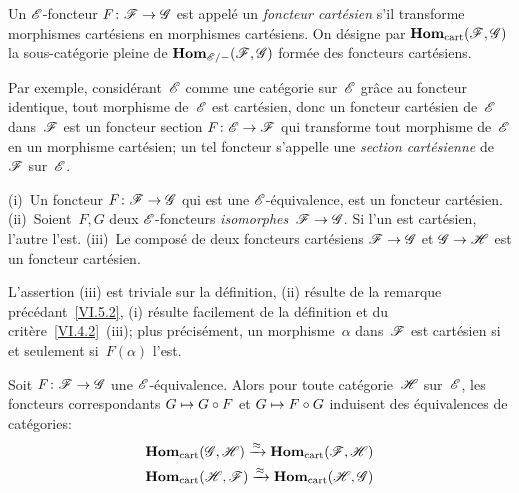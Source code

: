 \begin{definition}
\label{VI.5.2} Un $\cal{E}$-foncteur $F\colon \cal{F}\to\cal{G}$ est
appel\'e un \emph{foncteur cartésien}
s'il transforme morphismes cart\'esiens en morphismes
cart\'esiens. On d\'esigne par $\SheafHom_\cart(\cal{F},\cal{G})$
\label{indnot:fq}la sous-cat\'egorie pleine de
$\SheafHom_{\cal{E}/-}(\cal{F},\cal{G})$ form\'ee des foncteurs
cart\'esiens.

Par exemple, consid\'erant~$\cal{E}$ comme une cat\'egorie
sur~$\cal{E}$ gr\^ace au foncteur identique, tout morphisme
de~$\cal{E}$ est cart\'esien, donc un foncteur cart\'esien
de~$\cal{E}$ dans~$\cal{F}$ est un foncteur section $F\colon
\cal{E}\to\cal{F}$ qui transforme tout morphisme de~$\cal{E}$ en un
morphisme cart\'esien; un tel foncteur s'appelle une \emph{section
cartésienne} de~$\cal{F}$ sur~$\cal{E}$.
\end{definition}

\begin{proposition}
\label{VI.5.3} \textup{(i)}~Un foncteur $F\colon \cal{F} \to \cal{G}$ qui est une
$\cal{E}$-\'equivalence, est un foncteur cart\'esien.
\textup{(ii)}~Soient~$F,G$ deux $\cal{E}$-foncteurs
\emph{isomorphes}~$\cal{F}\to\cal{G}$. Si l'un est cart\'esien,
l'autre l'est. \textup{(iii)}~Le compos\'e de deux foncteurs cart\'esiens
$\cal{F}\to\cal{G}$ et $\cal{G}\to\cal{H}$ est un foncteur
cart\'esien.
\end{proposition}

L'assertion (iii) est triviale sur la d\'efinition, (ii)
r\'esulte de la remarque pr\'ec\'edant~\ref{VI.5.2}, (i) r\'esulte
facilement de la d\'efinition et du crit\`ere~\ref{VI.4.2}~(iii); plus
pr\'ecis\'ement, un morphisme~$\alpha$ dans~$\cal{F}$ est
cart\'esien si et seulement si~$F(\alpha)$ l'est.

\begin{corollaire}
\label{VI.5.4}
Soit $F \colon \cal{F} \to \cal{G}$ une
$\cal{E}$-\'equivalence. Alors pour toute cat\'egorie~$\cal{H}$
sur~$\cal{E}$, les foncteurs correspondants $G \mto G \circ F$ et
$G \mto F \circ G$ induisent des \'equivalences de
cat\'egories:
\begin{eqnarray*}
\SheafHom_\cart(\cal{G},\cal{H})\lto{\approx}
\SheafHom_\cart(\cal{F},\cal{H}) \\
\SheafHom_\cart(\cal{H},\cal{F})\lto{\approx}
\SheafHom_\cart(\cal{H}, \cal{G})
\end{eqnarray*}
\end{corollaire}

